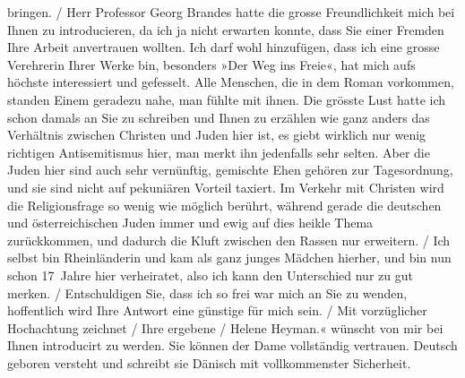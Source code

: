 \begin{ledgroupsized}[t]{13cm}
{{{                        bringen.{ / }Herr Professor Georg Brandes hatte die
                        grosse Freundlichkeit mich bei Ihnen zu introducieren, da ich ja nicht
                        erwarten konnte, dass Sie einer Fremden Ihre Arbeit anvertrauen wollten.
                        {\pb}Ich darf wohl hinzufügen, dass ich eine grosse Verehrerin Ihrer Werke
                        bin, besonders »Der Weg ins Freie«, hat
                        mich aufs höchste interessiert und gefesselt. Alle Menschen, die in dem
                        Roman vorkommen, standen Einem geradezu nahe, man fühlte mit ihnen. Die
                        grösste Lust hatte ich schon damals an Sie zu schreiben und Ihnen zu
                        erzählen wie ganz anders das Verhältnis zwischen Christen und Juden hier
                        ist, es giebt wirklich nur wenig richtigen Antisemitismus hier, man merkt
                        ihn jedenfalls sehr selten. Aber die Juden hier sind auch sehr
                        ver{\pb}nünftig, gemischte Ehen gehören zur Tagesordnung, und sie sind nicht
                        auf pekuniären Vorteil taxiert. Im Verkehr mit Christen wird die
                        Religionsfrage so wenig wie möglich berührt, während gerade die deutschen und österreichischen Juden immer und ewig auf dies heikle Thema
                        zurückkommen, und dadurch die Kluft zwischen den Rassen nur erweitern.{ / }Ich selbst bin Rheinländerin und kam als ganz junges Mädchen hierher, und bin nun
                        schon 17 Jahre hier verheiratet, also ich kann den Unterschied nur {\pb}zu
                        gut merken.{ / }Entschuldigen Sie, dass ich so frei war mich an Sie zu wenden, hoffentlich
                        wird Ihre Antwort eine günstige für mich sein.{ / }Mit vorzüglicher Hochachtung zeichnet{ / }Ihre ergebene{ / }Helene Heyman.«}}}\label{K_L02049_1h} wünscht von mir bei Ihnen introducirt zu werden. Sie können der
               Dame vollständig vertrauen. Deutsch geboren versteht und schreibt sie Dänisch mit vollkommenster Sicherheit.\pend
           
         
         \endnumbering{}\end{ledgroupsized}  \newcommand{\dateiname}{L02049}\newcommand{\titel}{Georg Brandes an Arthur Schnitzler, vor dem 2. 12. 1911}\newcommand{\editorInnen}{Martin Anton Müller und Gerd-Hermann Susen}
      